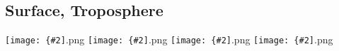 \documentclass[12pt,a4paper]{article}
\newcommand{\pngfig}[2][0.5]{\texttt{[image: \{\#2]}.png}}
\begin{document}
\section{}

\subsection{Surface, Troposphere}
\pngfig[0.5]{regprof_TO_Zon_NH}
\pngfig[0.5]{}
\pngfig[0.5]{}
\pngfig[0.5]{}
\end{document}
